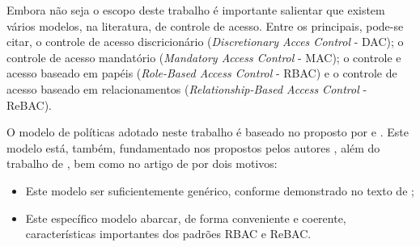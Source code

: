 Embora não seja o escopo deste trabalho é importante salientar que existem vários modelos, na literatura, de controle de acesso. Entre os principais, pode-se citar, o controle de acesso discricionário (\textit{Discretionary Acces Control} - DAC); o controle de acesso mandatório (\textit{Mandatory Access Control} - MAC); o controle e acesso baseado em papéis (\textit{Role-Based Access Control} - RBAC) e o controle de acesso baseado em relacionamentos (\textit{Relationship-Based Access Control} - ReBAC). %

O modelo de políticas adotado neste trabalho é baseado no proposto por  e \cite{sarkis:artigo:2016}. Este modelo está, também, fundamentado nos propostos pelos autores , além do trabalho de , bem como no artigo de  por dois motivos:
\begin{itemize}
	\item Este modelo ser suficientemente genérico, conforme demonstrado no texto de ;
	\item Este específico modelo abarcar, de forma conveniente e coerente, características importantes dos padrões RBAC e ReBAC.
\end{itemize}

